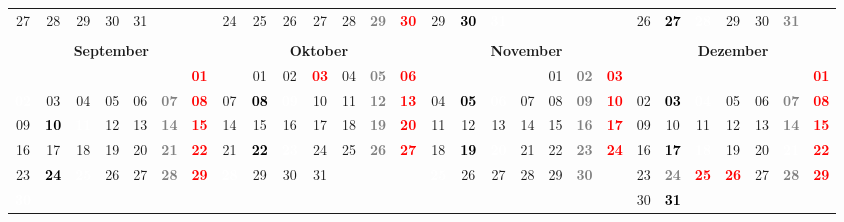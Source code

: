 \documentclass[10pt,a4paper,landscape]{article}
\newcommand{\bb}[1]{\cellcolor{MidnightBlue}\textcolor{white}{\bf #1}}
\newcommand{\yb}[1]{\cellcolor{yellow}\textcolor{black}{\bf #1}}
\newcommand{\iv}[1]{\cellcolor{black}\textcolor{white}{\bf #1}}
\newcommand{\rb}[1]{\textbf{\textcolor{red}{#1}}}
\newcommand{\hv}[1]{\textbf{\textcolor{Gray}{#1}}}
\begin{document}
\begin{tabular}{|ccccccc|ccccccc|ccccccc|ccccccc|}
27 & 28 & 29 & 30 & 31 & & & 24 & 25 & 26 & 27 & 28 & \hv{29} & \rb{30} & 29 & \yb{30} & \iv{31} & & & & & 26 & \yb{27} & \iv{28} & 29 & 30 & \hv{31} &  \\
& & & & & & & & & & & & & & & & & & & & & & & & & & &  \\
\hline
\multicolumn{7}{|c|}{\bf September} & \multicolumn{7}{|c|}{\bf Oktober} & \multicolumn{7}{|c|}{\bf November} & \multicolumn{7}{|c|}{\bf Dezember} \\
& & & & & & \rb{01} & & 01 & 02 & \rb{03} & 04 & \hv{05} & \rb{06} & & & & & 01 & \hv{02} & \rb{03} & & & & & & & \rb{01} \\
\bb{02} & 03 & 04 & 05 & 06 & \hv{07} & \rb{08} & 07 & \yb{08} & \iv{09} & 10 & 11 & \hv{12} & \rb{13} & 04 & \yb{05} & \iv{06} & 07 & 08 & \hv{09} & \rb{10} & 02 & \yb{03} & \iv{04} & 05 & 06 & \hv{07} & \rb{08} \\
09 & \yb{10} & \iv{11} & 12 & 13 & \hv{14} & \rb{15} & 14 & 15 & 16 & 17 & 18 & \hv{19} & \rb{20} & 11 & 12 & 13 & 14 & 15 & \hv{16} & \rb{17} & 09 & 10 & 11 & 12 & 13 & \hv{14} & \rb{15} \\
16 & 17 & 18 & 19 & 20 & \hv{21} & \rb{22} & 21 & \yb{22} & \iv{23} & 24 & 25 & \hv{26} & \rb{27} & 18 & \yb{19} & \iv{20} & 21 & 22 & \hv{23} & \rb{24} & 16 & \yb{17} & \iv{18} & 19 & 20 & \bb{21} & \rb{22} \\
23 & \yb{24} & \iv{25} & 26 & 27 & \hv{28} & \rb{29} & \bb{28} & 29 & 30 & 31 & & & & \bb{25} & 26 & 27 & 28 & 29 & \hv{30} & & 23 & \hv{24} & \rb{25} & \rb{26} & 27 & \hv{28} & \rb{29} \\
\bb{30} & & & & & & & & & & & & & & & & & & & & & 30 & \yb{31} & & & & &  \\
\hline
\end{tabular}
\end{document}
